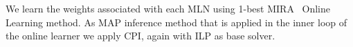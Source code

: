 We learn the weights associated with each MLN using 1-best MIRA~\citep{crammer01ultraconservative} Online Learning method. As MAP inference method that is applied in the inner loop of the online learner we apply CPI, again with ILP as base solver. 


